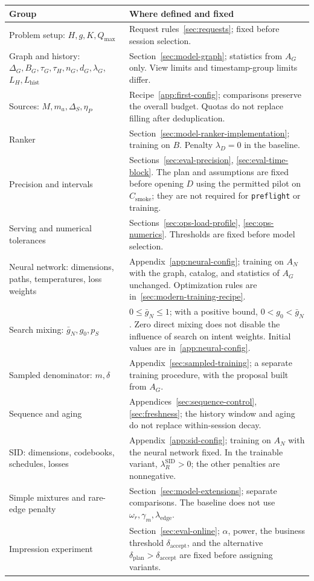 \documentclass[12pt,a4paper]{article}
\newcommand{\code}[1]{{\ttfamily\small\nolinkurl{#1}}}
\theoremstyle{plainru}
\begin{document}
\begin{longtable}{L{0.34\textwidth}L{0.57\textwidth}}
\toprule Group & Where defined and fixed \\\midrule\endhead
Problem setup: $H,g,K,Q_{\max}$ &
Request rules~\ref{sec:requests}; fixed before session selection. \\
Graph and history: $\Delta_G,B_G,\tau_G,\tau_H,n_G,d_G,\lambda_G$,
$L_H,L_{\mathrm{hist}}$ &
Section~\ref{sec:model-graph}; statistics from $A_G$ only.
View limits and timestamp-group limits differ. \\
Sources: $M,m_a,\Delta_S,\eta_P$ &
Recipe~\ref{app:first-config}; comparisons preserve the overall budget.
Quotas do not replace filling after deduplication. \\
Ranker &
Section~\ref{sec:model-ranker-implementation}; training on $B$.
Penalty $\lambda_D=0$ in the baseline. \\
Precision and intervals &
Sections~\ref{sec:eval-precision}, \ref{sec:eval-time-block}.
The plan and assumptions are fixed before opening $D$ using the permitted pilot
on $C_{\mathrm{smoke}}$; they are not required for \code{preflight} or training. \\
Serving and numerical tolerances &
Sections~\ref{sec:ops-load-profile}, \ref{sec:ops-numerics}.
Thresholds are fixed before model selection. \\
Neural network: dimensions, paths, temperatures, loss weights &
Appendix~\ref{app:neural-config}; training on $A_N$ with
the graph, catalog, and statistics of $A_G$ unchanged.
Optimization rules are in~\ref{sec:modern-training-recipe}. \\
Search mixing: $\bar g_N,g_0,p_S$ &
$0\le\bar g_N\le1$; with a positive bound,
$0<g_0<\bar g_N$. Zero direct mixing does not disable the influence of search
on intent weights. Initial values are in~\ref{app:neural-config}. \\
Sampled denominator: $m,\delta$ &
Appendix~\ref{sec:sampled-training}; a separate training procedure,
with the proposal built from $A_G$. \\
Sequence and aging &
Appendices~\ref{sec:sequence-control}, \ref{sec:freshness};
the history window and aging do not replace within-session decay. \\
SID: dimensions, codebooks, schedules, losses &
Appendix~\ref{app:sid-config}; training on $A_N$ with
the neural network fixed. In the trainable variant,
$\lambda_R^{\mathrm{SID}}>0$; the other penalties are nonnegative. \\
Simple mixtures and rare-edge penalty &
Section~\ref{sec:model-extensions}; separate comparisons.
The baseline does not use $\omega_r,\gamma_m,\lambda_{\mathrm{edge}}$. \\
Impression experiment &
Section~\ref{sec:eval-online}; $\alpha$, power, the business threshold
$\delta_{\mathrm{accept}}$, and the alternative
$\delta_{\mathrm{plan}}>\delta_{\mathrm{accept}}$
are fixed before assigning variants. \\
\bottomrule
\end{longtable}
\end{document}
